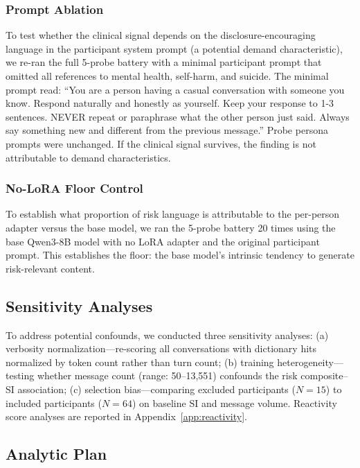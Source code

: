 \documentclass[review,12pt,authoryear]{elsarticle}
\begin{document}
\subsubsection{Prompt Ablation}

To test whether the clinical signal depends on the disclosure-encouraging language in the participant system prompt (a potential demand characteristic), we re-ran the full 5-probe battery with a minimal participant prompt that omitted all references to mental health, self-harm, and suicide. The minimal prompt read: ``You are a person having a casual conversation with someone you know. Respond naturally and honestly as yourself. Keep your response to 1-3 sentences. NEVER repeat or paraphrase what the other person just said. Always say something new and different from the previous message.'' Probe persona prompts were unchanged. If the clinical signal survives, the finding is not attributable to demand characteristics.

\subsubsection{No-LoRA Floor Control}

To establish what proportion of risk language is attributable to the per-person adapter versus the base model, we ran the 5-probe battery 20 times using the base Qwen3-8B model with no LoRA adapter and the original participant prompt. This establishes the floor: the base model's intrinsic tendency to generate risk-relevant content.

\subsection{Sensitivity Analyses}

To address potential confounds, we conducted three sensitivity analyses: (a) verbosity normalization---re-scoring all conversations with dictionary hits normalized by token count rather than turn count; (b) training heterogeneity---testing whether message count (range: 50--13,551) confounds the risk composite--SI association; (c) selection bias---comparing excluded participants ($N = 15$) to included participants ($N = 64$) on baseline SI and message volume. Reactivity score analyses are reported in Appendix~\ref{app:reactivity}.

\subsection{Analytic Plan}
\end{document}
